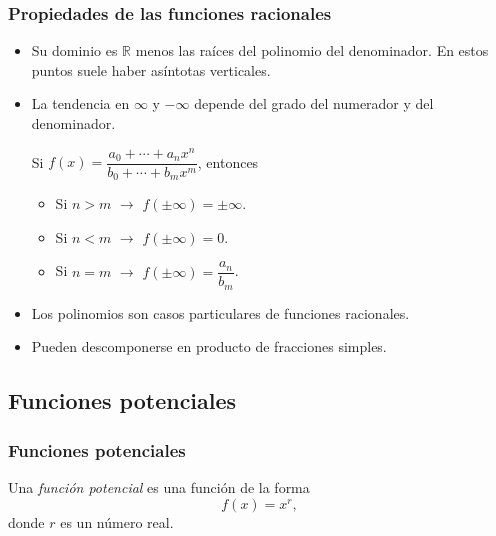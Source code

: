 \begin{frame}
\frametitle{Propiedades de las funciones racionales}
\begin{itemize}
\item Su dominio es $\mathbb{R}$ menos las raíces del polinomio del denominador. En estos puntos suele haber asíntotas
verticales.
\item La tendencia en $\infty$ y $-\infty$ depende del grado del numerador y del denominador. 

Si $f(x)=\dfrac{a_0+\cdots +a_nx^n}{b_0+\cdots+b_mx^m}$, entonces
\begin{itemize}
  \item Si $n>m$ $\rightarrow$ $f(\pm\infty)=\pm\infty$.
  \item Si $n<m$ $\rightarrow$ $f(\pm\infty)=0$.
  \item Si $n=m$ $\rightarrow$ $f(\pm\infty)=\dfrac{a_n}{b_m}$.
\end{itemize}
\item Los polinomios son casos particulares de funciones racionales. 
\item Pueden descomponerse en producto de fracciones simples.
\end{itemize}
\end{frame} 



\subsection{Funciones potenciales}
\begin{frame}
\frametitle{Funciones potenciales}
\begin{definicion}
Una \emph{función potencial} es una función de la forma
\[
f(x)=x^r,
\]
donde $r$ es un número real.
\end{definicion}
\begin{center}
\scalebox{1}{}
\end{center}
\end{frame} 


